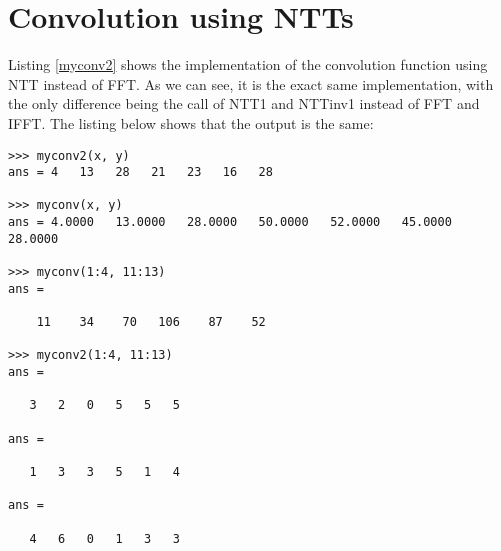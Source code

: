 \documentclass{article}
\begin{document}
\section{Convolution using NTTs}
Listing \ref{myconv2} shows the implementation of the convolution function using NTT instead of FFT. As we can see, it is the exact same implementation, with the only difference being the call of NTT1 and NTTinv1 instead of FFT and IFFT. The listing below shows that the output is the same:

\begin{lstlisting}
>>> myconv2(x, y)
ans = 4   13   28   21   23   16   28

>>> myconv(x, y)
ans = 4.0000   13.0000   28.0000   50.0000   52.0000   45.0000   28.0000

>>> myconv(1:4, 11:13)
ans =

    11    34    70   106    87    52

>>> myconv2(1:4, 11:13)
ans =

   3   2   0   5   5   5

ans =

   1   3   3   5   1   4

ans =

   4   6   0   1   3   3
\end{lstlisting}


 
\end{document}
